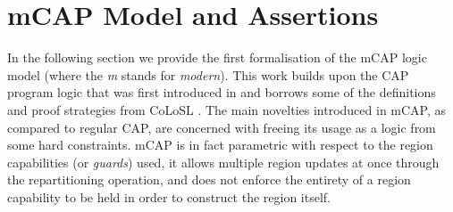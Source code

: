 \section{mCAP Model and Assertions}

\label{sec:mcapModel}

In the following section we provide the first formalisation of the mCAP logic model (where the \textit{m} stands for \textit{modern}). This work builds upon the CAP program logic that was first introduced in \cite{cap} and borrows some of the definitions and proof strategies from CoLoSL \cite{colosl}. The main novelties introduced in mCAP, as compared to regular CAP, are concerned with freeing its usage as a logic from some hard constraints. mCAP is in fact parametric with respect to the region capabilities (or \textit{guards}) used, it allows multiple region updates at once through the repartitioning operation, and does not enforce the entirety of a region capability to be held in order to construct the region itself.



\newpage



\newpage

